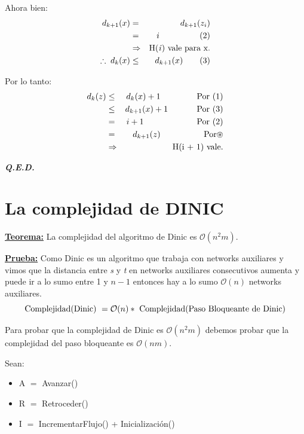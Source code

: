 \documentclass[12pt,a4paper]{report}
\newcommand{\QED}{\hfill \textit{\textbf{Q.E.D.}}}
\begin{document}
\begin{enumerate}
				\par Ahora bien:
				\begin{eqnarray}
					\nonumber d_{k + 1}(x) &=& d_{k + 1}(z_{i}) \\
					\nonumber &=& i \qquad \qquad \; \; \; (2) \\
					\nonumber &\Rightarrow & \textup{H(\textit{i}) vale para x.} \\
					\nonumber \therefore \; d_{k}(x) & \leq & d_{k + 1}(x) \qquad (3)
				\end{eqnarray}

				\par Por lo tanto:
				\begin{eqnarray}
					\nonumber d_{k}(z) &\leq & d_{k}(x) + 1 \qquad \qquad \textup{ Por } (1) \\
					\nonumber &\leq & d_{k + 1}(x) + 1 \qquad \; \; \; \; \textup{ Por (3)} \\
					\nonumber &=& i + 1 \qquad \qquad \qquad \textup{ Por } (2) \\
					\nonumber &=& d_{k + 1}(z) \qquad \qquad \; \; \; \textup{ Por} \circledast \\
					\nonumber & \Rightarrow & \textup{H(i + 1) vale.}
				\end{eqnarray}
			\end{enumerate}

		\QED

	\pagebreak
	\section{La complejidad de DINIC}
		\textbf{\underline{Teorema:}} La complejidad del algoritmo de Dinic es $\mathcal{O}(n^{2}m)$.

		\textbf{\underline{Prueba:}} Como Dinic es un algoritmo que trabaja con networks auxiliares y vimos que la distancia entre \textit{s} y \textit{t} en networks auxiliares consecutivos aumenta y puede ir a lo sumo entre 1 y $n - 1$ entonces hay a lo sumo $\mathcal{O}(n)$ networks auxiliares.
			\[ \textup{Complejidad(Dinic) } = \mathcal{O}(n) * \textup{ Complejidad(Paso Bloqueante de Dinic)} \]
			\par Para probar que la complejidad de Dinic es $\mathcal{O}(n^{2}m)$ debemos probar que la complejidad del paso bloqueante es $\mathcal{O}(nm)$.
			\par Sean:
			\begin{itemize}
				\item A $=$ Avanzar()
				\item R $=$ Retroceder()
				\item I $=$ IncrementarFlujo() + Inicialización()
			\end{itemize}
\end{document}
